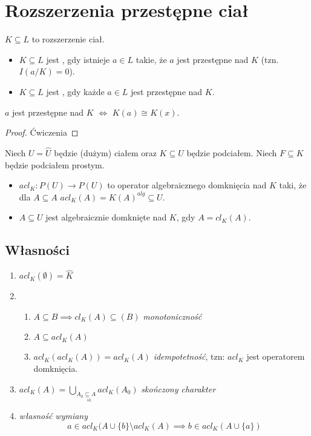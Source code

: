 \section{Rozszerzenia przestępne ciał}

$K\subseteq L$ to rozszerzenie ciał.

\begin{bbox}
    \begin{itemize}
        \item[\PHtunny] $K\subseteq L$ jest , gdy istnieje $a\in L$ takie, że $a$ jest przestępne nad $K$ (tzn. $I(a/K)=0$).
        \item[\PHtunny] $K\subseteq L$ jest , gdy każde $a\in L$ jest przestępne nad $K$.
    \end{itemize}
\end{bbox}

\begin{remark}
$a$ jest przestępne nad $K$ $\iff$ $K(a)\cong K(x)$.
\end{remark}
\begin{proof}
Ćwiczenia
\end{proof}

Niech $U=\hat{U}$ będzie (dużym) ciałem oraz $K\subseteq U$ będzie podciałem. Niech $F\subseteq K$ będzie podciałem prostym.
\begin{bbox}
\begin{itemize}
    \item[\PHtunny] $acl_K:P(U)\to P(U)$ to operator algebraicznego domknięcia nad $K$ taki, że dla $A\subseteq A$ $acl_K(A)=K(A)^{alg}\subseteq U$.
    \item[\PHtunny] $A\subseteq U$ jest algebraicznie domknięte nad $K$, gdy $A=cl_K(A)$.
\end{itemize}
\end{bbox}

\subsection{Własności}
\begin{enumerate}
    \item $acl_K(\emptyset)=\hat{K}$
    \item 
        \begin{enumerate}
            \item $A\subseteq B\implies cl_K(A)\subseteq(B)$ \emph{monotoniczność}
            \item $A\subseteq acl_K(A)$
            \item $acl_K(acl_K(A))=acl_K(A)$ \emph{idempotetność}, tzn: $acl_K$ jest operatorem domknięcia.
        \end{enumerate}
    \item $acl_K(A)=\bigcup_{A_0\underset{sk.}{\subseteq A}}acl_K(A_0)$ \emph{skończony charakter}
    \item \emph{własność wymiany}
    $$a\in acl_K(A\cup\{b\}\setminus acl_K(A)\implies b\in acl_K(A\cup \{a\})$$
\end{enumerate}

